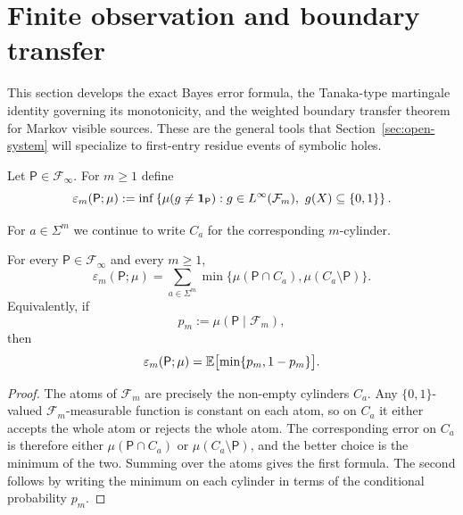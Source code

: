 \section{Finite observation and boundary transfer}\label{sec:clarity}

This section develops the exact Bayes error formula, the Tanaka-type
martingale identity governing its monotonicity, and the weighted
boundary transfer theorem for Markov visible sources.  These are the
general tools that Section~\ref{sec:open-system} will specialize to
first-entry residue events of symbolic holes.

\begin{definition}
\label{def:scan-error}
Let \(\mathsf{P}\in\mathcal{F}_\infty\).  For \(m\geq 1\) define
\[
  \varepsilon_m(\mathsf{P};\mu)
  := \inf\left\{
      \mu(g\neq \mathbf{1}_{\mathsf{P}}):
      g\in L^\infty(\mathcal{F}_m),\ g(X)\subseteq\{0,1\}
     \right\}.
\]
\end{definition}

For \(a\in\Sigma^m\) we continue to write \(C_a\) for the corresponding
\(m\)-cylinder.

\begin{proposition}
\label{prop:scan-error-cylinder}
For every \(\mathsf{P}\in\mathcal{F}_\infty\) and every \(m\geq 1\),
\[
  \varepsilon_m(\mathsf{P};\mu)
  = \sum_{a\in\Sigma^m}
      \min\bigl\{\mu(\mathsf{P}\cap C_a),
                 \mu(C_a\setminus\mathsf{P})\bigr\}.
\]
Equivalently, if
\[
  p_m := \mu(\mathsf{P}\mid \mathcal{F}_m),
\]
then
\[
  \varepsilon_m(\mathsf{P};\mu)
  = \mathbb{E}\bigl[\min\{p_m,1-p_m\}\bigr].
\]
\end{proposition}

\begin{proof}
The atoms of \(\mathcal{F}_m\) are precisely the non-empty cylinders
\(C_a\).  Any \(\{0,1\}\)-valued \(\mathcal{F}_m\)-measurable function is
constant on each atom, so on \(C_a\) it either accepts the whole atom or
rejects the whole atom.  The corresponding error on \(C_a\) is
therefore either \(\mu(\mathsf{P}\cap C_a)\) or
\(\mu(C_a\setminus\mathsf{P})\), and the better choice is the minimum of
the two.  Summing over the atoms gives the first formula.  The second
follows by writing the minimum on each cylinder in terms of the
conditional probability \(p_m\).
\end{proof}

